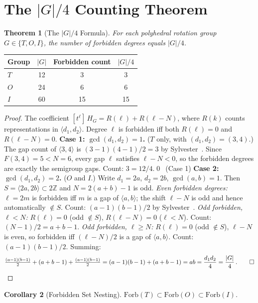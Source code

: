\documentclass[11pt,letterpaper]{article}
\newtheorem{theorem}{Theorem}[section]
\newtheorem{corollary}[theorem]{Corollary}
\theoremstyle{definition}
\newcommand{\Forb}{\mathrm{Forb}}
\newcommand{\ZZ}{\mathbb{Z}}
\newcommand{\abs}[1]{\lvert #1 \rvert}
\newcommand{\gen}[1]{\langle #1 \rangle}
\begin{document}
\section{The \texorpdfstring{$\abs{G}/4$}{|G|/4} Counting Theorem}\label{sec:g4}
\begin{theorem}[The $\abs{G}/4$ Formula]\label{thm:g4}
For each polyhedral rotation group $G\in\{T,O,I\}$, the number of forbidden degrees equals $\abs{G}/4$.
\end{theorem}
\begin{center}
\begin{tabular}{lccc}
\toprule
Group & $\abs{G}$ & Forbidden count & $\abs{G}/4$ \\
\midrule
$T$ & 12 & 3 & 3 \\
$O$ & 24 & 6 & 6 \\
$I$ & 60 & 15 & 15 \\
\bottomrule
\end{tabular}
\end{center}
\begin{proof}
The coefficient $[t^\ell]\,H_G = R(\ell)+R(\ell-N)$, where $R(k)$ counts representations in $\gen{d_1,d_2}$.  Degree $\ell$ is forbidden iff both $R(\ell)=0$ and $R(\ell-N)=0$.
\smallskip\noindent
\textbf{Case 1: $\gcd(d_1,d_2)=1$.}  ($T$ only, with $(d_1,d_2)=(3,4)$.)  The gap count of $\gen{3,4}$ is $(3{-}1)(4{-}1)/2=3$ by Sylvester~\cite{Sylvester1882}.  Since $F(3,4)=5<N=6$, every gap $\ell$ satisfies $\ell-N<0$, so the forbidden degrees are exactly the semigroup gaps.  Count: $3=12/4$.\qed~(Case 1)
\smallskip\noindent
\textbf{Case 2: $\gcd(d_1,d_2)=2$.}  ($O$ and $I$.)  Write $d_1=2a$, $d_2=2b$, $\gcd(a,b)=1$.  Then $S=\gen{2a,2b}\subset 2\ZZ$ and $N=2(a{+}b)-1$ is odd.
\emph{Even forbidden degrees:} $\ell=2m$ is forbidden iff $m$ is a gap of $\gen{a,b}$; the shift $\ell-N$ is odd and hence automatically $\notin S$.  Count: $(a{-}1)(b{-}1)/2$ by Sylvester~\cite{Sylvester1882}.
\emph{Odd forbidden, $\ell<N$:} $R(\ell)=0$ (odd $\notin S$), $R(\ell-N)=0$ ($\ell<N$).  Count: $(N{-}1)/2=a{+}b{-}1$.
\emph{Odd forbidden, $\ell\ge N$:} $R(\ell)=0$ (odd $\notin S$), $\ell-N$ is even, so forbidden iff $(\ell{-}N)/2$ is a gap of $\gen{a,b}$.  Count: $(a{-}1)(b{-}1)/2$.
Summing:
\[
  \tfrac{(a-1)(b-1)}{2}+(a+b-1)+\tfrac{(a-1)(b-1)}{2} = (a-1)(b-1)+(a+b-1) = ab = \frac{d_1 d_2}{4} = \frac{\abs{G}}{4}\,.\qed
\]
\end{proof}
\begin{corollary}[Forbidden Set Nesting]\label{cor:nesting}
$\Forb(T)\subset\Forb(O)\subset\Forb(I)$.
\end{corollary}
\end{document}
